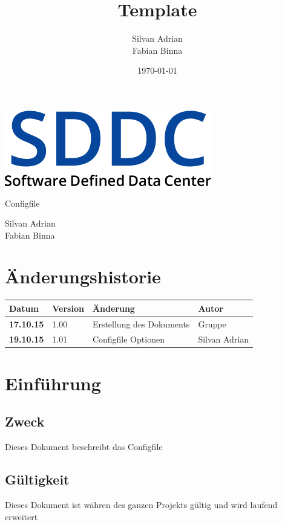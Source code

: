 \documentclass[11pt]{scrartcl}
\title{Template}
\author{Silvan Adrian \\ Fabian Binna}
\date{\today{}}
\begin{document}
\def\arraystretch{1.5}
\begin{titlepage}
\begin{center}
\vspace{10em}
\includegraphics[scale=2]{SDDC}
\vspace{10em}
\end{center}
\begin{center}
\huge {Configfile}
\end{center}
\begin{center}
\vspace{10em}
\LARGE {Silvan Adrian} \\
\LARGE {Fabian Binna}
\end{center}

\end{titlepage}

\newpage
\section{Änderungshistorie}
\begin{tabularx}{\linewidth}{l l X l}
\textbf{Datum} & \textbf{Version} & \textbf{Änderung}  & \textbf{Autor} \\
\hline
\textbf{17.10.15} & 1.00 & Erstellung des Dokuments & Gruppe \\
\textbf{19.10.15} & 1.01 & Configfile Optionen& Silvan Adrian \\
\end{tabularx}

\newpage
\tableofcontents
\newpage
\section{Einführung}
\subsection{Zweck}
Dieses Dokument beschreibt das Configfile
\subsection{Gültigkeit}
Dieses Dokument ist währen des ganzen Projekts gültig und wird laufend erweitert
\end{document}
